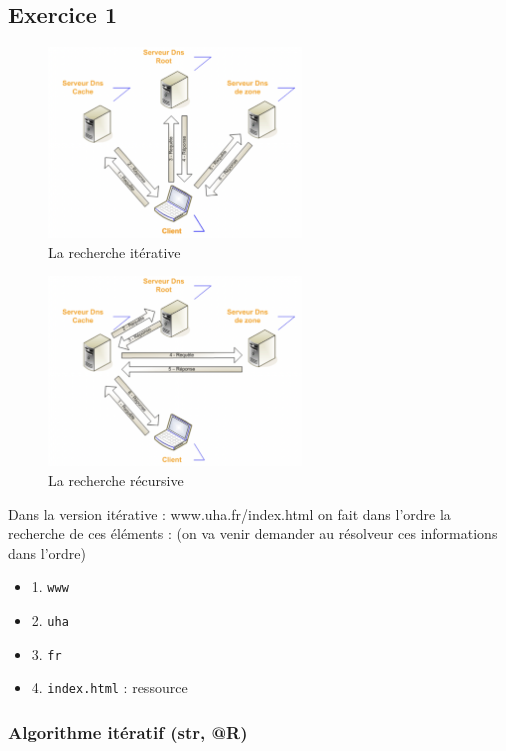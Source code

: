 \documentclass[12pt, a4paper]{article}
\begin{document}
    \subsection{Exercice 1}
    \begin{figure}[H]
        \centering
        \includegraphics[width=0.6\textwidth]{../img/iteratif.png}
        \caption{La recherche itérative}
        \label{fig:iteratif}
    \end{figure}
    \begin{figure}[H]
        \centering
        \includegraphics[width=0.6\textwidth]{../img/recursif.png}
        \caption{La recherche récursive}
        \label{fig:recursif}
    \end{figure}
\newpage
Dans la version itérative : www.uha.fr/index.html on fait dans l'ordre la 
recherche de ces éléments : (on va venir demander au résolveur ces informations
dans l'ordre)
\begin{itemize}
    \item 1. \texttt{www} 
    \item 2. \texttt{uha} 
    \item 3. \texttt{fr} 
    \item 4. \texttt{index.html} : ressource
\end{itemize}
    \subsubsection{Algorithme itératif (str, @R)}
\end{document}
